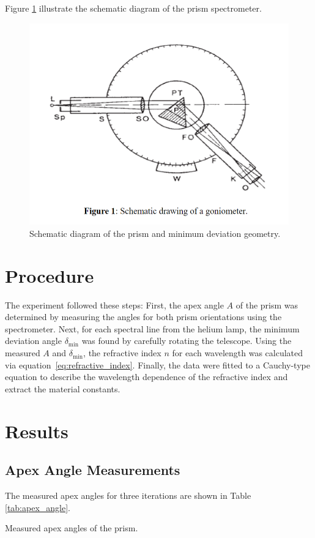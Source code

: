 \documentclass[journal]{IEEEtran}
\begin{document}
Figure  \ref{fig:diagram} illustrate the schematic diagram of the prism spectrometer.
\begin{figure}[H]
    \centering
    \includegraphics[width=0.6\linewidth]{../IMAGES/prism_diagram.png}
    \caption{Schematic diagram of the prism and minimum deviation geometry.}
    \label{fig:diagram}
\end{figure}
\section*{Procedure}
The experiment followed these steps: First, the apex angle \( A \) of the prism was determined by measuring the angles for both prism orientations using the spectrometer. Next, for each spectral line from the helium lamp, the minimum deviation angle \( \delta_{\min} \) was found by carefully rotating the telescope. Using the measured \( A \) and \( \delta_{\min} \), the refractive index \( n \) for each wavelength was calculated via equation~\ref{eq:refractive_index}. Finally, the data were fitted to a Cauchy-type equation to describe the wavelength dependence of the refractive index and extract the material constants.

\section{Results}
\subsection{Apex Angle Measurements}
The measured apex angles for three iterations are shown in Table \ref{tab:apex_angle}.

\begin{table}[H]
    \centering
    \caption{Measured apex angles of the prism.}
    \label{tab:apex_angle}
\end{table}
\end{document}
